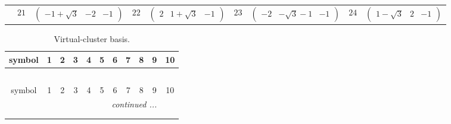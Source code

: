 \documentclass[fleqn,10pt,landscape]{article}
\begin{document}
\begin{itemize}
{\begin{center}
\begin{longtable}{ccccccccc}
& $ 21 $ & $ \begin{pmatrix} -1 + \sqrt{3} & -2 & -1 \end{pmatrix} $ & $ 22 $ & $ \begin{pmatrix} 2 & 1 + \sqrt{3} & -1 \end{pmatrix} $ & $ 23 $ & $ \begin{pmatrix} -2 & - \sqrt{3} - 1 & -1 \end{pmatrix} $ & $ 24 $ & $ \begin{pmatrix} 1 - \sqrt{3} & 2 & -1 \end{pmatrix} $ \\
\end{longtable}
\end{center}
\begin{center}
\renewcommand{\arraystretch}{1.7}
\begin{longtable}{ccccccccccc}
\caption{Virtual-cluster basis.}
 \\
 \hline \hline
symbol & 1 & 2 & 3 & 4 & 5 & 6 & 7 & 8 & 9 & 10 \\ \hline \endfirsthead

\multicolumn{10}{l}{\tablename\ \thetable{}} \\
 \hline \hline
symbol & 1 & 2 & 3 & 4 & 5 & 6 & 7 & 8 & 9 & 10 \\ \hline \endhead

 \hline \hline
\multicolumn{10}{r}{\footnotesize\it continued ...} \\ \endfoot

 \hline \hline
\multicolumn{10}{r}{} \\ \endlastfoot


\end{longtable}
\end{center}}
\end{itemize}
\end{document}
